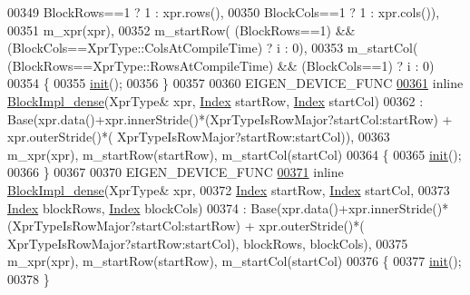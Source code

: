 \begin{DoxyCode}
00349              BlockRows==1 ? 1 : xpr.rows(),
00350              BlockCols==1 ? 1 : xpr.cols()),
00351         m\_xpr(xpr),
00352         m\_startRow( (BlockRows==1) && (BlockCols==XprType::ColsAtCompileTime) ? i : 0),
00353         m\_startCol( (BlockRows==XprType::RowsAtCompileTime) && (BlockCols==1) ? i : 0)
00354     \{
00355       \hyperlink{structinit}{init}();
00356     \}
00357 
00360     EIGEN\_DEVICE\_FUNC
\hyperlink{class_eigen_1_1internal_1_1_block_impl__dense_3_01_xpr_type_00_01_block_rows_00_01_block_cols_00_01_inner_panel_00_01true_01_4_aaa47737cd19396275d5bcb6d9520e49f}{00361}     \textcolor{keyword}{inline} \hyperlink{class_eigen_1_1internal_1_1_block_impl__dense_3_01_xpr_type_00_01_block_rows_00_01_block_cols_00_01_inner_panel_00_01true_01_4_aaa47737cd19396275d5bcb6d9520e49f}{BlockImpl\_dense}(XprType& xpr, \hyperlink{namespace_eigen_a62e77e0933482dafde8fe197d9a2cfde}{Index} startRow, 
      \hyperlink{namespace_eigen_a62e77e0933482dafde8fe197d9a2cfde}{Index} startCol)
00362       : Base(xpr.data()+xpr.innerStride()*(XprTypeIsRowMajor?startCol:startRow) + xpr.outerStride()*(
      XprTypeIsRowMajor?startRow:startCol)),
00363         m\_xpr(xpr), m\_startRow(startRow), m\_startCol(startCol)
00364     \{
00365       \hyperlink{structinit}{init}();
00366     \}
00367 
00370     EIGEN\_DEVICE\_FUNC
\hyperlink{class_eigen_1_1internal_1_1_block_impl__dense_3_01_xpr_type_00_01_block_rows_00_01_block_cols_00_01_inner_panel_00_01true_01_4_a9e2d1e641a5000ca0c10b1eaeab84adf}{00371}     \textcolor{keyword}{inline} \hyperlink{class_eigen_1_1internal_1_1_block_impl__dense_3_01_xpr_type_00_01_block_rows_00_01_block_cols_00_01_inner_panel_00_01true_01_4_a9e2d1e641a5000ca0c10b1eaeab84adf}{BlockImpl\_dense}(XprType& xpr,
00372           \hyperlink{namespace_eigen_a62e77e0933482dafde8fe197d9a2cfde}{Index} startRow, \hyperlink{namespace_eigen_a62e77e0933482dafde8fe197d9a2cfde}{Index} startCol,
00373           \hyperlink{namespace_eigen_a62e77e0933482dafde8fe197d9a2cfde}{Index} blockRows, \hyperlink{namespace_eigen_a62e77e0933482dafde8fe197d9a2cfde}{Index} blockCols)
00374       : Base(xpr.data()+xpr.innerStride()*(XprTypeIsRowMajor?startCol:startRow) + xpr.outerStride()*(
      XprTypeIsRowMajor?startRow:startCol), blockRows, blockCols),
00375         m\_xpr(xpr), m\_startRow(startRow), m\_startCol(startCol)
00376     \{
00377       \hyperlink{structinit}{init}();
00378     \}

\end{DoxyCode}
